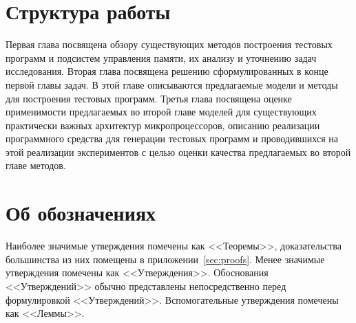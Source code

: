 \documentclass[14pt]{extreport}
\makeatletter
\renewcommand\appendix{\par
  \setcounter{chapter}{0}%
  \setcounter{section}{0}%
  \def\@chapapp{\appendixname}%
  \def\thechapter{\@Asbuk\c@chapter}}
\makeatother
\begin{document}
\section*{Структура работы}
Первая глава посвящена обзору существующих методов построения тестовых программ и подсистем управления памяти, их анализу и уточнению задач исследования. Вторая глава посвящена решению сформулированных в конце первой главы задач. В этой главе описываются предлагаемые модели и методы для построения тестовых программ. Третья глава посвящена оценке применимости предлагаемых во второй главе моделей для существующих практически важных архитектур микропроцессоров, описанию реализации программного средства для генерации тестовых программ и проводившихся на этой реализации экспериментов с целью оценки качества предлагаемых во второй главе методов.

\section*{Об обозначениях}

Наиболее значимые утверждения помечены как <<Теоремы>>, доказательства большинства из них помещены в приложении~\ref{sec:proofs}. Менее значимые утверждения помечены как <<Утверждения>>. Обоснования <<Утверждений>> обычно представлены непосредственно перед формулировкой <<Утверждений>>. Вспомогательные утверждения помечены как <<Леммы>>.











\pagebreak
\appendix
% 





\pagebreak




\end{document}
